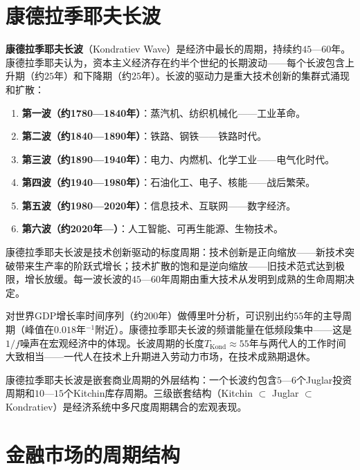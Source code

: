\section{康德拉季耶夫长波}

\begin{definition}[康德拉季耶夫长波]\label{def:kondratiev_wave}
\textbf{康德拉季耶夫长波}（Kondratiev Wave）是经济中最长的周期，持续约$45$—$60$年。康德拉季耶夫认为，资本主义经济存在约半个世纪的长期波动——每个长波包含上升期（约$25$年）和下降期（约$25$年）。长波的驱动力是重大技术创新的集群式涌现和扩散：
\begin{enumerate}[label=(\roman*)]
    \item \textbf{第一波（约1780—1840年）}：蒸汽机、纺织机械化——工业革命。
    \item \textbf{第二波（约1840—1890年）}：铁路、钢铁——铁路时代。
    \item \textbf{第三波（约1890—1940年）}：电力、内燃机、化学工业——电气化时代。
    \item \textbf{第四波（约1940—1980年）}：石油化工、电子、核能——战后繁荣。
    \item \textbf{第五波（约1980—2020年）}：信息技术、互联网——数字经济。
    \item \textbf{第六波（约2020年—）}：人工智能、可再生能源、生物技术。
\end{enumerate}
康德拉季耶夫长波是技术创新驱动的标度周期：技术创新是正向缩放——新技术突破带来生产率的阶跃式增长；技术扩散的饱和是逆向缩放——旧技术范式达到极限，增长放缓。每一波长波的$45$—$60$年周期由重大技术从发明到成熟的生命周期决定。
\end{definition}

\begin{proposition}[康德拉季耶夫长波的傅里叶分析]\label{prop:kondratiev_fourier}
对世界GDP增长率时间序列（约$200$年）做傅里叶分析，可识别出约$55$年的主导周期（峰值在$0.018$年$^{-1}$附近）。康德拉季耶夫长波的频谱能量在低频段集中——这是$1/f$噪声在宏观经济中的体现。长波周期的长度$T_{\mathrm{Kond}} \approx 55$年与两代人的工作时间大致相当——一代人在技术上升期进入劳动力市场，在技术成熟期退休。

康德拉季耶夫长波是嵌套商业周期的外层结构：一个长波约包含$5$—$6$个Juglar投资周期和$10$—$15$个Kitchin库存周期。三级嵌套结构（Kitchin $\subset$ Juglar $\subset$ Kondratiev）是经济系统中多尺度周期耦合的宏观表现。
\end{proposition}

\section{金融市场的周期结构}

